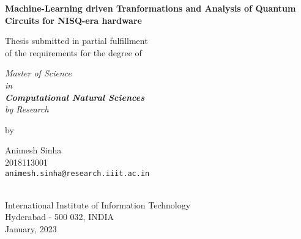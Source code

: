 \thispagestyle{empty}
\begin{center}
\vspace*{1.5cm}
{\Large \bf Machine-Learning driven Tranformations and Analysis of Quantum Circuits for NISQ-era hardware}

\vspace*{3.75cm}
{\large Thesis submitted in partial fulfillment\\}
{\large  of the requirements for the degree of \\}

\vspace*{1cm}
{\it {\large Master of Science \\ in \\ \textbf{Computational Natural Sciences} \\ by Research}\\}
    

\vspace*{1cm}
{\large by}

\vspace*{5mm}
{\large Animesh Sinha\\}
{\large 2018113001\\
{\small \tt animesh.sinha@research.iiit.ac.in}}


\vspace*{4.0cm}
{\\}
{\large International Institute of Information Technology\\}
{\large Hyderabad - 500 032, INDIA\\}
{\large January, 2023\\}
\end{center}